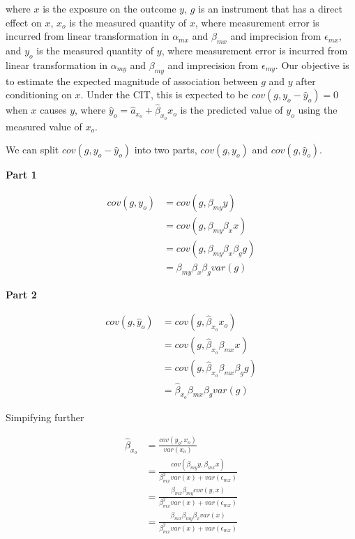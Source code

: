 \documentclass[]{article}
\begin{document}
where \(x\) is the exposure on the outcome \(y\), \(g\) is an instrument
that has a direct effect on \(x\), \(x_o\) is the measured quantity of
\(x\), where measurement error is incurred from linear transformation in
\(\alpha_{mx}\) and \(\beta_{mx}\) and imprecision from
\(\epsilon_{mx}\), and \(y_o\) is the measured quantity of \(y\), where
measurement error is incurred from linear transformation in
\(\alpha_{my}\) and \(\beta_{my}\) and imprecision from
\(\epsilon_{my}\). Our objective is to estimate the expected magnitude
of association between \(g\) and \(y\) after conditioning on \(x\).
Under the CIT, this is expected to be \(cov(g, y_o - \hat{y}_o) = 0\)
when \(x\) causes \(y\), where
\(\hat{y}_o = \hat{a}_{x_o} + \hat{\beta}_{x_o} x_o\) is the predicted
value of \(y_o\) using the measured value of \(x_o\).

We can split \(cov(g, y_o - \hat{y}_o)\) into two parts, \(cov(g, y_o)\)
and \(cov(g, \hat{y}_o)\).

\textbf{Part 1}

\[
\begin{aligned}
cov(g, y_o) & = cov(g, \beta_{my} y) \\
            & = cov(g, \beta_{my} \beta_x x) \\
            & = cov(g, \beta_{my} \beta_x \beta_g g) \\
            & = \beta_{my} \beta_x \beta_g var(g)
\end{aligned}
\]

\textbf{Part 2}

\[
\begin{aligned}
cov(g, \hat{y}_o) & = cov(g, \hat{\beta}_{x_o} x_o) \\
                  & = cov(g, \hat{\beta}_{x_o} \beta_{mx} x) \\
                  & = cov(g, \hat{\beta}_{x_o} \beta_{mx} \beta_g g) \\
                  & = \hat{\beta}_{x_o} \beta_{mx} \beta_g var(g)
\end{aligned}
\]

Simpifying further

\[
\begin{aligned}
\hat{\beta}_{x_o} & = \frac{cov(y_o, x_o)} {var(x_o)} \\
                  & = \frac{cov(\beta_{my} y, \beta_{mx} x)} {\beta_{mx}^2 var(x) + var(\epsilon_{mx})} \\
                  & = \frac{\beta_{mx} \beta_{my} cov(y, x)} {\beta_{mx}^2 var(x) + var(\epsilon_{mx})} \\
                  & = \frac{\beta_{mx} \beta_{my} \beta_x var(x)} {\beta_{mx}^2 var(x) + var(\epsilon_{mx})}
\end{aligned}
\]
\end{document}
